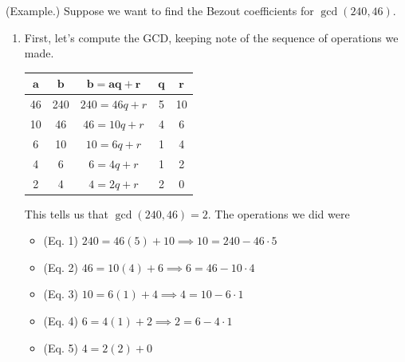 \documentclass[letterpaper]{article}
\newcommand{\0}{\mathbf{0}}
\begin{document}
\begin{mdframed}
    (Example.) Suppose we want to find the Bezout coefficients for $\gcd(240, 46)$. 
    \begin{enumerate}
        \item First, let's compute the GCD, keeping note of the sequence of operations we made. 
        \begin{center}
            \begin{tabular}{|c|c|c|c|c|}
                \hline 
                $\mathbf{a}$ & $\mathbf{b}$ & $\mathbf{b = aq + r}$ & $\mathbf{q}$ & $\mathbf{r}$ \\ 
                \hline 
                46 & 240 & $240 = 46q + r$ & 5 & 10 \\ 
                10 & 46 & $46 = 10q + r$ & 4 & 6 \\ 
                6 & 10 & $10 = 6q + r$ & 1 & 4 \\ 
                4 & 6 & $6 = 4q + r$ & 1 & 2 \\ 
                2 & 4 & $4 = 2q + r$ & 2 & 0 \\
                \hline 
            \end{tabular}
        \end{center}
        This tells us that $\gcd(240, 46) = 2$. The operations we did were 
        \begin{itemize}
            \item (Eq. 1) $240 = 46(5) + 10 \implies 10 = 240 - 46 \cdot 5$
            \item (Eq. 2) $46 = 10(4) + 6 \implies 6 = 46 - 10 \cdot 4$
            \item (Eq. 3) $10 = 6(1) + 4 \implies 4 = 10 - 6 \cdot 1$
            \item (Eq. 4) $6 = 4(1) + 2 \implies 2 = 6 - 4 \cdot 1$
            \item (Eq. 5) $4 = 2(2) + 0$
        \end{itemize}


\end{enumerate}
\end{mdframed}
\end{document}
